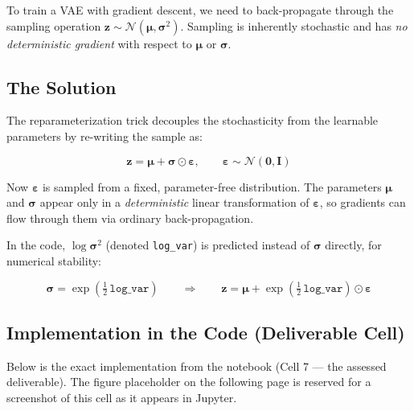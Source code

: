 \documentclass[12pt,a4paper]{article}
\begin{document}
To train a VAE with gradient descent, we need to back-propagate through the sampling operation $\mathbf{z} \sim \mathcal{N}(\boldsymbol{\mu}, \boldsymbol{\sigma}^2)$. Sampling is inherently stochastic and has \emph{no deterministic gradient} with respect to $\boldsymbol{\mu}$ or $\boldsymbol{\sigma}$.

\subsection{The Solution}

The reparameterization trick decouples the stochasticity from the learnable parameters by re-writing the sample as:

\begin{equation}
    \mathbf{z} = \boldsymbol{\mu} + \boldsymbol{\sigma} \odot \boldsymbol{\varepsilon}, \qquad \boldsymbol{\varepsilon} \sim \mathcal{N}(\mathbf{0}, \mathbf{I})
\end{equation}

Now $\boldsymbol{\varepsilon}$ is sampled from a fixed, parameter-free distribution. The parameters $\boldsymbol{\mu}$ and $\boldsymbol{\sigma}$ appear only in a \emph{deterministic} linear transformation of $\boldsymbol{\varepsilon}$, so gradients can flow through them via ordinary back-propagation.

In the code, $\log\boldsymbol{\sigma}^2$ (denoted \texttt{log\_var}) is predicted instead of $\boldsymbol{\sigma}$ directly, for numerical stability:

\begin{equation}
    \boldsymbol{\sigma} = \exp\!\left(\tfrac{1}{2}\,\texttt{log\_var}\right)
    \qquad \Longrightarrow \qquad
    \mathbf{z} = \boldsymbol{\mu} + \exp\!\left(\tfrac{1}{2}\,\texttt{log\_var}\right) \odot \boldsymbol{\varepsilon}
\end{equation}

\subsection{Implementation in the Code (Deliverable Cell)}

Below is the exact implementation from the notebook (Cell 7 — the assessed deliverable). The figure placeholder on the following page is reserved for a screenshot of this cell as it appears in Jupyter.
\end{document}
